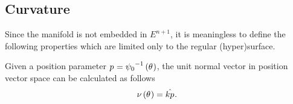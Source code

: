 \documentclass[../main.tex]{subfiles}
\begin{document}
\subsection{Curvature}
\begin{remark}
    Since the manifold is not embedded in $E^{n+1}$, it is meaningless to define the following properties which are limited only to the regular (hyper)surface.
\end{remark}
\begin{lemma}\label{M:Normal}
    Given a position parameter $\tensor{p}{}={\psi_0}^{-1}\left(\tensor{\theta}{}\right)$,
    the unit normal vector in position vector space can be calculated as follows
    \begin{equation*}
        \nu\left(\tensor{\theta}{}\right)
        = \hat{k\tensor{p}{}}
        \text{.}
    \end{equation*}
\end{lemma}
\end{document}
